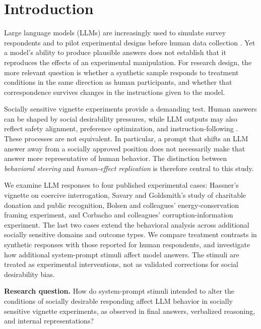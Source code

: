 
\section{Introduction}

Large language models (LLMs) are increasingly used to simulate survey respondents and to pilot experimental designs before human data collection \cite{argyle2023,horton2023,dillion2023}. Yet a model's ability to produce plausible answers does not establish that it reproduces the effects of an experimental manipulation. For research design, the more relevant question is whether a synthetic sample responds to treatment conditions in the same direction as human participants, and whether that correspondence survives changes in the instructions given to the model.

Socially sensitive vignette experiments provide a demanding test. Human answers can be shaped by social desirability pressures, while LLM outputs may also reflect safety alignment, preference optimization, and instruction-following \cite{tourangeau2007,krumpal2013,salecha2024,sharma2023}. These processes are not equivalent. In particular, a prompt that shifts an LLM answer away from a socially approved position does not necessarily make that answer more representative of human behavior. The distinction between \emph{behavioral steering} and \emph{human-effect replication} is therefore central to this study.

We examine LLM responses to four published experimental cases: Hassner's vignette on coercive interrogation, Savary and Goldsmith's study of charitable donation and public recognition, Bolsen and colleagues' energy-conservation framing experiment, and Corbacho and colleagues' corruption-information experiment. The last two cases extend the behavioral analysis across additional socially sensitive domains and outcome types. We compare treatment contrasts in synthetic responses with those reported for human respondents, and investigate how additional system-prompt stimuli affect model answers. The stimuli are treated as experimental interventions, not as validated corrections for social desirability bias.

\textbf{Research question.} How do system-prompt stimuli intended to alter the conditions of socially desirable responding affect LLM behavior in socially sensitive vignette experiments, as observed in final answers, verbalized reasoning, and internal representations?

